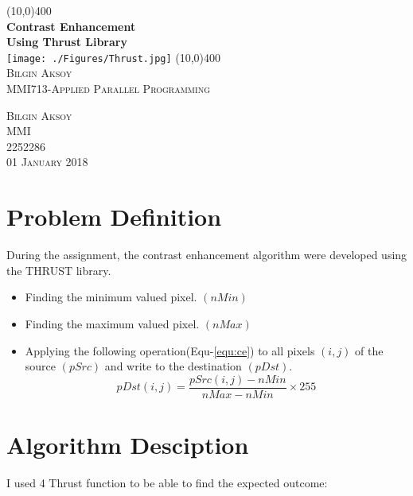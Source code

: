 \documentclass[11pt]{article} %
\title{}
\author{}
\begin{document}
\begin{titlepage}
	\begin{center}
		\line(10,0){400}\\
		[4mm] %
		\huge{\bfseries Contrast Enhancement} \\
		\huge{\bfseries Using Thrust Library} \\
		[1mm]
		\texttt{[image: ./Figures/Thrust.jpg]}
		\line(10,0){400}\\
		[1 cm]
		\textsc{\LARGE Bilgin Aksoy}\\
		[1 cm]
		\textsc{\large MMI713-Applied Parallel Programming}\\
		[10 cm]
	\end{center}
	
	\begin{flushright}
		\textsc{\large Bilgin Aksoy\\
		MMI\\
		2252286\\
		01 January 2018\\
		}
	\end{flushright}
\end{titlepage} 
\setcounter{page}{1}

\section{Problem Definition }
	\justifying During the assignment, the contrast enhancement algorithm were developed using the THRUST library.
	\begin{itemize}
		\item Finding the minimum valued pixel. $(nMin)$
		\item Finding the maximum valued pixel. $(nMax)$
		\item Applying the following operation(Equ-\ref{equ:ce}) to all pixels $(i,j)$ of the source $(pSrc)$ and write to the destination $(pDst)$.
		\begin{equation}
		\label{equ:ce}
		pDst(i,j)=\frac {pSrc(i,j)-nMin}{nMax-nMin}\times 255
		\end{equation}
	\end{itemize}
\section{Algorithm Desciption}
	\justifying I used 4 Thrust function to be able to find the expected outcome:
\end{document}
